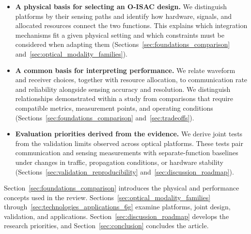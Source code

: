 \begin{itemize}
\item \textbf{A physical basis for selecting an O-ISAC design.}
We distinguish platforms by their sensing paths and identify how hardware,
signals, and allocated resources connect the two functions. This explains
which integration mechanisms fit a given physical setting and which
constraints must be considered when adapting them
(Sections~\ref{sec:foundations_comparison}
and~\ref{sec:optical_modality_families}).

\item \textbf{A common basis for interpreting performance.}
We relate waveform and receiver choices, together with resource allocation,
to communication rate and reliability alongside sensing accuracy and
resolution. We distinguish relationships demonstrated within a study from
comparisons that require compatible metrics, measurement points, and
operating conditions
(Sections~\ref{sec:foundations_comparison} and~\ref{sec:tradeoffs}).

\item \textbf{Evaluation priorities derived from the evidence.}
We derive joint tests from the validation limits observed across optical
platforms. These tests pair communication and sensing measurements with
separate-function baselines under changes in traffic, propagation conditions,
or hardware stability
(Sections~\ref{sec:validation_reproducibility}
and~\ref{sec:discussion_roadmap}).
\end{itemize}

Section~\ref{sec:foundations_comparison} introduces the physical and performance
concepts used in the review. Sections~\ref{sec:optical_modality_families}
through~\ref{sec:technologies_applications_6g} examine platforms, joint design,
validation, and applications. Section~\ref{sec:discussion_roadmap} develops the
research priorities, and Section~\ref{sec:conclusion} concludes the article.
